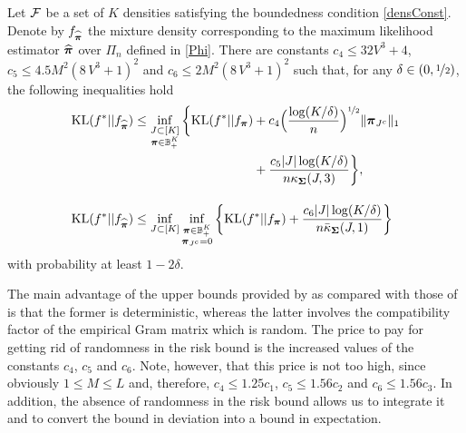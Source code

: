 \begin{theorem}
	\label{maintheo2}
	Let $\cal F$ be a set of $K$ densities satisfying the boundedness condition \eqref{densConst}.
	Denote by $f_{\widehat{\boldsymbol \pi}}$ the mixture density corresponding to the maximum likelihood estimator
	$\widehat{\boldsymbol \pi}$ over $\Pi_n$ defined in \eqref{Phi}. There are constants $c_4\le 32V^3 + 4$,
	$c_5\le 4.5M^2(8\,V^3+1)^2$ and $c_6\le 2M^2(8\,V^3+1)^2$ such that, for any
	$\delta \in (0,\nicefrac12)$, the following inequalities hold
	\begin{align}
	\KL(f^*|| f_{\hat\bpi}) &\leq \inf_{\substack{J\subset [K]\\ \bpi \in \BB_+^K}}
	\bigg\{ \KL(f^*|| f_{\bpi}) + c_4\Big(\frac{\log(K/\delta)}{n}\Big)^{\nicefrac12} \|\bpi_{J^c}\|_1\nonumber\\
	&\phantom{{}\leq \inf_{\substack{J\subset [K]\\ \bpi \in \BB_+^K}}
	\bigg\{ \KL(f^*|| f_{\bpi})} +
	\frac{c_5|J|\log(K/\delta)}{n\kappa_{\bSigma}(J,3)} \bigg\},\label{boundDevThree}\\
	\KL(f^*|| f_{\hat\bpi}) &\leq \inf_{J\subset [K]}\inf_{\substack{\bpi \in \BB_+^K\\ \bpi_{J^c}=0}}
	\bigg\{ \KL(f^*|| f_{\bpi}) +
	\frac{c_6|J|\log(K/\delta)}{n\bar\kappa_{\bSigma}(J,1)} \bigg\}\label{boundDevFour}
	\end{align}
	with probability at least $1-2\delta$.
\end{theorem}

The main advantage of the upper bounds provided by  as compared with those of
 is that the former is deterministic, whereas the latter involves the
compatibility factor of the empirical Gram matrix which is random. The price to pay for getting
rid of randomness in the risk bound is the increased values of the constants $c_4$, $c_5$ and $c_6$.
Note, however, that this price is not too high, since obviously $1\le M\le L$ and, therefore,
$c_4\le 1.25 c_1$, $c_5\le 1.56 c_2$ and $c_6\le 1.56 c_3$. In addition, the absence of randomness
in the risk bound allows us to integrate it and to convert the bound in deviation into a bound
in expectation.

